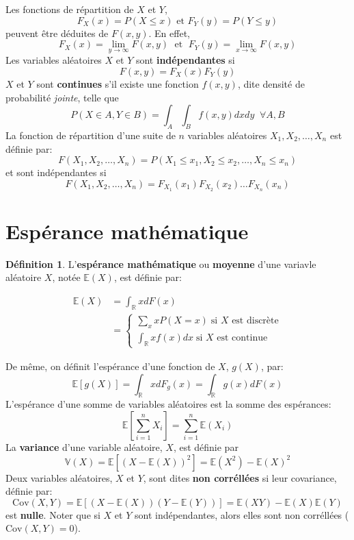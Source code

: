 \documentclass[
]{book}
\theoremstyle{definition}
\newtheorem{definition}{Définition}[chapter]
\theoremstyle{definition}
\theoremstyle{definition}
\theoremstyle{remark}
\begin{document}
Les fonctions de répartition de \(X\) et \(Y\),
\[
F_X(x)=P(X\leq x) \text{ et }F_Y(y)=P(Y\leq y)
\]
peuvent être déduites de \(F(x,y)\). En effet,
\[
F_X(x)=\lim_{y \longrightarrow \infty}F(x,y) \; \text{ et }\;F_Y(y)=\lim_{x \longrightarrow \infty}F(x,y)
\]
Les variables aléatoires \(X\) et \(Y\) sont \textbf{indépendantes} si
\[
F(x,y)=F_X(x) F_Y(y)
\]
\(X\) et \(Y\) sont \textbf{continues} s'il existe une fonction \(f(x,y)\), dite densité de probabilité \emph{jointe}, telle que
\[
P(X\in A, Y\in B)=\int_A\int_B f(x,y)dxdy\;\; \forall A,B
\]
La fonction de répartition d'une suite de \(n\) variables aléatoires \(X_1, X_2, \ldots, X_n\) est définie par:
\[
F(X_1, X_2, \ldots, X_n)=P(X_1\leq x_1, X_2\leq x_2, \ldots, X_n \leq x_n)
\]
et sont indépendantes si
\[
F(X_1, X_2, \ldots, X_n)=F_{X_1}(x_1)F_{X_2}(x_2)\ldots F_{X_n}(x_n)
\]

\hypertarget{espuxe9rance-mathuxe9matique}{%
\section{Espérance mathématique}\label{espuxe9rance-mathuxe9matique}}

\begin{definition}
\protect\hypertarget{def:unnamed-chunk-10}{}{\label{def:unnamed-chunk-10} }L'\textbf{espérance mathématique} ou \textbf{moyenne} d'une variavle aléatoire \(X\), notée \(\mathbb{E}(X)\), est définie par:

\begin{align*}
\mathbb{E}(X) & = \int_{\mathbb{R}}x dF(x)\\
 & = \begin{cases}
   \displaystyle \sum_x xP(X=x)\; \text{si }X \text{ est discrète}\\
 \displaystyle  \int_{\mathbb{R}} xf(x)dx \; \text{si }X \text{ est continue}
     \end{cases}
  \end{align*}
\end{definition}

De même, on définit l'espérance d'une fonction de \(X\), \(g(X)\), par:
\[
\mathbb{E}\left[ g(X)\right]=\int_{\mathbb{R}}x dF_g(x)=\int_{\mathbb{R}}g(x) dF(x)
\]
L'espérance d'une somme de variables aléatoires est la somme des espérances:
\[
\mathbb{E}\left[\sum_{i=1}^n X_i \right]=\sum_{i=1}^n\mathbb{E}(X_i)
\]
La \textbf{variance} d'une variable aléatoire, \(X\), est définie par
\[
\mathbb{V}(X)=\mathbb{E}\left[{(X-\mathbb{E}(X))}^2 \right]=\mathbb{E}(X^2)-{\mathbb{E}(X)}^2
\]
Deux variables aléatoires, \(X\) et \(Y\), sont dites \textbf{non corréllées} si leur covariance, définie par:
\[
\text{Cov}(X,Y)=\mathbb{E}\left[(X-\mathbb{E}(X))(Y-\mathbb{E}(Y))\right]=\mathbb{E}(XY)-\mathbb{E}(X)\mathbb{E}(Y)
\]
est \textbf{nulle}. Noter que si \(X\) et \(Y\) sont indépendantes, alors elles sont non corréllées (\(\text{Cov}(X,Y)=0\)).
\end{document}
